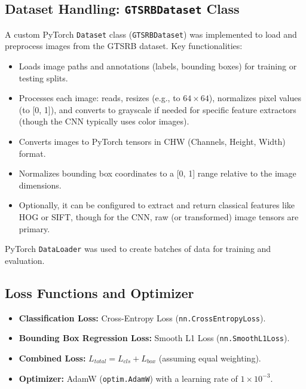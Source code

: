 \documentclass[11pt, a4paper]{article}
\begin{document}
\subsection{Dataset Handling: \texttt{GTSRBDataset} Class}
A custom PyTorch \texttt{Dataset} class (\texttt{GTSRBDataset}) was implemented to load and preprocess images from the GTSRB dataset.
Key functionalities:
\begin{itemize}
    \item Loads image paths and annotations (labels, bounding boxes) for training or testing splits.
    \item Processes each image: reads, resizes (e.g., to $64 \times 64$), normalizes pixel values (to [0, 1]), and converts to grayscale if needed for specific feature extractors (though the CNN typically uses color images).
    \item Converts images to PyTorch tensors in CHW (Channels, Height, Width) format.
    \item Normalizes bounding box coordinates to a [0, 1] range relative to the image dimensions.
    \item Optionally, it can be configured to extract and return classical features like HOG or SIFT, though for the CNN, raw (or transformed) image tensors are primary.
\end{itemize}
PyTorch \texttt{DataLoader} was used to create batches of data for training and evaluation.

\subsection{Loss Functions and Optimizer}
\begin{itemize}
    \item \textbf{Classification Loss:} Cross-Entropy Loss (\texttt{nn.CrossEntropyLoss}).
    \item \textbf{Bounding Box Regression Loss:} Smooth L1 Loss (\texttt{nn.SmoothL1Loss}).
    \item \textbf{Combined Loss:} $L_{total} = L_{cls} + L_{box}$ (assuming equal weighting).
    \item \textbf{Optimizer:} AdamW (\texttt{optim.AdamW}) with a learning rate of $1 \times 10^{-3}$.
\end{itemize}
\end{document}
